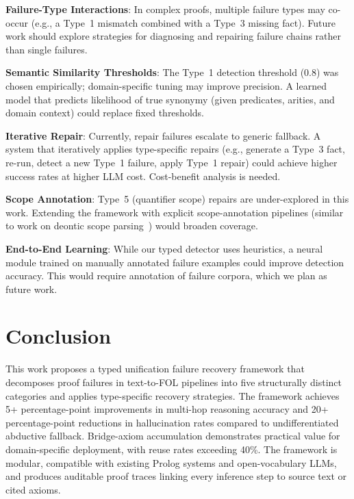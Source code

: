 \documentclass[11pt,letterpaper]{article}
\begin{document}
\textbf{Failure-Type Interactions}: In complex proofs, multiple failure types may co-occur (e.g., a Type~1 mismatch combined with a Type~3 missing fact). Future work should explore strategies for diagnosing and repairing failure chains rather than single failures.

\textbf{Semantic Similarity Thresholds}: The Type~1 detection threshold (0.8) was chosen empirically; domain-specific tuning may improve precision. A learned model that predicts likelihood of true synonymy (given predicates, arities, and domain context) could replace fixed thresholds.

\textbf{Iterative Repair}: Currently, repair failures escalate to generic fallback. A system that iteratively applies type-specific repairs (e.g., generate a Type~3 fact, re-run, detect a new Type~1 failure, apply Type~1 repair) could achieve higher success rates at higher LLM cost. Cost-benefit analysis is needed.

\textbf{Scope Annotation}: Type~5 (quantifier scope) repairs are under-explored in this work. Extending the framework with explicit scope-annotation pipelines (similar to work on deontic scope parsing~\citep{Chen2026}) would broaden coverage.

\textbf{End-to-End Learning}: While our typed detector uses heuristics, a neural module trained on manually annotated failure examples could improve detection accuracy. This would require annotation of failure corpora, which we plan as future work.

\section{Conclusion}

This work proposes a typed unification failure recovery framework that decomposes proof failures in text-to-FOL pipelines into five structurally distinct categories and applies type-specific recovery strategies. The framework achieves 5+ percentage-point improvements in multi-hop reasoning accuracy and 20+ percentage-point reductions in hallucination rates compared to undifferentiated abductive fallback. Bridge-axiom accumulation demonstrates practical value for domain-specific deployment, with reuse rates exceeding 40\%. The framework is modular, compatible with existing Prolog systems and open-vocabulary LLMs, and produces auditable proof traces linking every inference step to source text or cited axioms.
\end{document}
